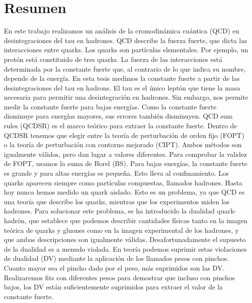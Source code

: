 \documentclass[11pt,a4paper]{article}
\begin{document}
\section*{Resumen}
En este trabajo realizamos un análisis de la cromodinámica cuántica (QCD) en
desintegraciones del tau en hadrones. QCD describe la fuerza fuerte, que dicta
las interacciones entre quarks. Los quarks son partículas elementales. Por
ejemplo, un protón está constituido de tres quarks. La fuerza de las
interacciones está determinada por la constante fuerte que, al contrario de lo
que indica su nombre, depende de la energía. En esta tesis medimos la constante
fuerte a partir de las desintegraciones del tau en hadrons. El tau es el único
leptón que tiene la masa necesaria para permitir una desintegración en hadrones.
Sin embargo, nos permite medir la constante fuerte para bajas energías. Como la
constante fuerte disminuye para energías mayores, sus errores también
disminuyen. QCD sum rules (QCDSR) es el marco teórico para extraer la constante
fuerte. Dentro de QCDSR tenemos que elegir entre la teoría de perturbación de
orden fijo (FOPT) o la teoría de perturbación con contorno mejorado (CIPT).
Ambos métodos son igualmente válidos, pero dan lugar a valores diferentes. Para
comprobar la validez de FOPT, usamos la suma de Borel (BS). Para bajas energías,
la constante fuerte es grande y para altas energías es pequeña. Esto lleva al
confinamiento. Los quarks aparecen siempre como partículas compuestas, llamados
hadrones. Hasta hoy nunca hemos medido un quark aislado. Esto es un problema, ya
que QCD es una teoría que describe los quarks, mientras que los experimentos
miden los hadrones. Para solucionar este problema, se ha introducido la dualidad
quark-hadrón, que establece que podemos describir cantidades físicas tanto en la
imagen teórica de quarks y gluones como en la imagen experimental de los
hadrones, y que ambas descripciones son igualmente válidas. Desafortunadamente
el supuesto de la dualidad es a menudo violada. En teoría podemos suprimir estas
violaciones de dualidad (DV) mediante la aplicación de los llamados pesos con
pinchos. Cuanto mayor sea el pincho dado por el peso, más suprimidos son las DV.
Realizaremos fits con diferentes pesos para demostrar que incluso con pinchos
bajos, los DV están suficientemente suprimidos para extraer el valor de la
constante fuerte.
\end{document}
